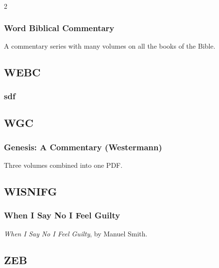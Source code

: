 \begin{multicols}{2}
		\subsubsection*{Word Biblical Commentary}
		
			A commentary series with many volumes on all the books of the Bible.
		
	\subsection*{WEBC}
	
		\subsubsection*{sdf}
		
	\subsection*{WGC}
	
		\subsubsection*{Genesis: A Commentary (Westermann)}
		
			Three volumes combined into one PDF.
		
	\subsection*{WISNIFG}
	
		\subsubsection*{When I Say No I Feel Guilty}
		
			\textit{When I Say No I Feel Guilty}, by Manuel Smith.
			
	\subsection*{ZEB}
	

\end{multicols}
